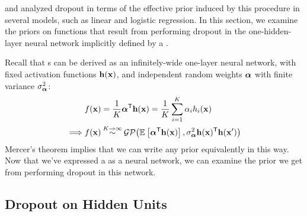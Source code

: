 \citet{baldi2013understanding} and \citet{wang2013fast} analyzed dropout in terms of the effective prior induced by this procedure in several models, such as linear and logistic regression.
In this section, we examine the priors on functions that result from performing dropout in the one-hidden-layer neural network implicitly defined by a \gp{}.

Recall that \gp{}s can be derived as an infinitely-wide one-layer neural network, with fixed activation functions ${\bf{h}}({\bf{x}})$, and independent random weights $\boldsymbol{\alpha}$ with finite variance $\sigma^2_{\boldsymbol{\alpha}}$:
%
\begin{align}
& f({\bf{x}}) = \frac{1}{K}{\mathbf {\boldsymbol{\alpha}}}^{\mathsf{T}} {\bf{h}}({\bf{x}}) = \frac{1}{K} \sum_{i=1}^K \alpha_i h_i({\bf{x}})
\\
\implies & f({\bf{x}}) \mathbin{\overset{K \to \infty}{\sim}} \mathcal{GP}\!\left(\mathbb{E}_{} \left[ {\boldsymbol{\alpha}^{\mathsf{T}} {\bf{h}}({\bf{x}})} \right],\sigma^2_{\boldsymbol{\alpha}} {\bf{h}}({\bf{x}})^{\mathsf{T}}{\bf{h}}({\bf{x}}')\right)
\label{eq:one-layer-gp-two}
\end{align}
%
Mercer's theorem implies that we can write any \gp{} prior equivalently in this way.
Now that we've expressed a \gp{} as a neural network, we can examine the prior we get from performing dropout in this network.

\subsection{Dropout on Hidden Units}

